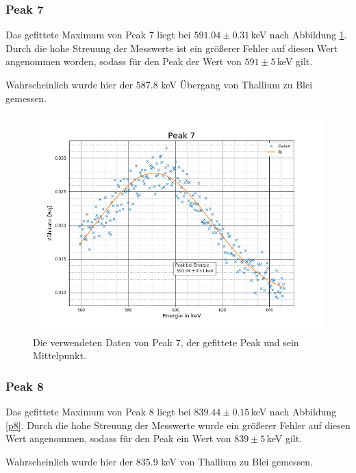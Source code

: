\subsubsection{Peak 7}
Das gefittete Maximum von Peak 7 liegt bei $591.04\pm0.31\,$keV nach Abbildung \ref{p7}. Durch die hohe Streuung der Messwerte ist ein größerer Fehler auf diesen Wert angenommen worden, sodass für den Peak der Wert von $591\pm5\,$keV gilt.\par
Wahrscheinlich wurde hier der 587.8 keV \cite{Thallium} Übergang von Thallium zu Blei gemessen.

\begin{figure}[h]
	\centering
	\includegraphics[scale=0.7]{Bilder/Anhang/P7}
	\caption[Thorium Peak 7]{\small Die verwendeten Daten von Peak 7, der gefittete Peak und sein Mittelpunkt.}
	\label{p7}
\end{figure}
\FloatBarrier
\subsubsection{Peak 8}
Das gefittete Maximum von Peak 8 liegt bei $839.44\pm0.15\,$keV nach Abbildung \ref{p8}. Durch die hohe Streuung der Messwerte wurde ein größerer Fehler auf diesen Wert angenommen, sodass für den Peak ein Wert von $839\pm5\,$keV gilt.\par
Wahrscheinlich wurde hier der 835.9 keV \cite{Thallium} von Thallium zu Blei gemessen.

